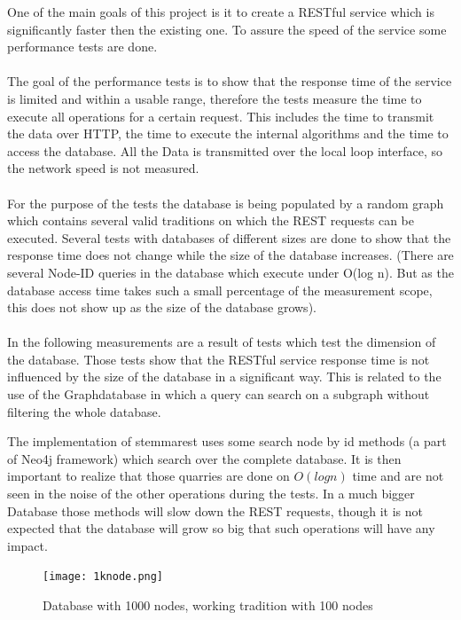 \documentclass[11pt,fleqn,openany]{book} %
\begin{document}
One of the main goals of this project is it to create a  RESTful service which is significantly faster then the existing one. To assure the speed of the service some performance tests are done. 
\\ \quad \\
The goal of the performance tests is to show that the response time of the service is limited and within a usable range, therefore the tests measure the time to execute all operations for a certain request. This includes the time to transmit the data over HTTP, the time to execute the internal algorithms and the time to access the database. All the Data is transmitted over the local loop interface, so the network speed is not measured. 
\\ \quad \\
For the purpose of the tests the database is being populated by a random graph which contains several valid traditions on which the REST requests can be executed. Several tests with databases of different sizes are done to show that the response time does not change while the size of the database increases. (There are several Node-ID queries in the database which execute under O(log n). But as the database access time takes such a small percentage of the measurement scope, this does not show up as the size of the database grows).
\\ \quad \\
In the following measurements are a result of tests which test the dimension of the database. Those tests show that the RESTful service response time is not influenced by the size of the database in a significant way. This is related to the use of the Graphdatabase in which a query can search on a subgraph without filtering the whole database. 
\begin{remark}
The implementation of stemmarest uses some search node by id methods (a part of Neo4j framework) which search over the complete database. It is then important to realize that those quarries are done on $O(log n)$ time and are not seen in the noise of the other operations during the tests. In a much bigger Database those methods will slow down the REST requests, though it is not expected that the database will grow so big that such operations will have any impact.
\end{remark} 

\begin{figure}[h!]
  \caption{Database with 1000 nodes,  working tradition with 100 nodes }
  \centering
    \texttt{[image: 1knode.png]}
\end{figure}
\end{document}
